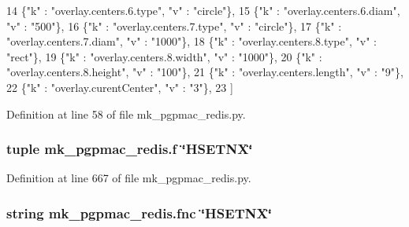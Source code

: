 \begin{DoxyCode}
14     \{\textcolor{stringliteral}{"k"} : \textcolor{stringliteral}{"overlay.centers.6.type"},   \textcolor{stringliteral}{"v"} : \textcolor{stringliteral}{"circle"}\},
15     \{\textcolor{stringliteral}{"k"} : \textcolor{stringliteral}{"overlay.centers.6.diam"},   \textcolor{stringliteral}{"v"} : \textcolor{stringliteral}{"500"}\},
16     \{\textcolor{stringliteral}{"k"} : \textcolor{stringliteral}{"overlay.centers.7.type"},   \textcolor{stringliteral}{"v"} : \textcolor{stringliteral}{"circle"}\},
17     \{\textcolor{stringliteral}{"k"} : \textcolor{stringliteral}{"overlay.centers.7.diam"},   \textcolor{stringliteral}{"v"} : \textcolor{stringliteral}{"1000"}\},
18     \{\textcolor{stringliteral}{"k"} : \textcolor{stringliteral}{"overlay.centers.8.type"},   \textcolor{stringliteral}{"v"} : \textcolor{stringliteral}{"rect"}\},
19     \{\textcolor{stringliteral}{"k"} : \textcolor{stringliteral}{"overlay.centers.8.width"},  \textcolor{stringliteral}{"v"} : \textcolor{stringliteral}{"1000"}\},
20     \{\textcolor{stringliteral}{"k"} : \textcolor{stringliteral}{"overlay.centers.8.height"}, \textcolor{stringliteral}{"v"} : \textcolor{stringliteral}{"100"}\},
21     \{\textcolor{stringliteral}{"k"} : \textcolor{stringliteral}{"overlay.centers.length"},   \textcolor{stringliteral}{"v"} : \textcolor{stringliteral}{"9"}\},
22     \{\textcolor{stringliteral}{"k"} : \textcolor{stringliteral}{"overlay.curentCenter"},     \textcolor{stringliteral}{"v"} : \textcolor{stringliteral}{"3"}\},
23     ]
\end{DoxyCode}


Definition at line 58 of file mk\-\_\-pgpmac\-\_\-redis.\-py.

\hypertarget{namespacemk__pgpmac__redis_a057fe7457503e0de97edcf855591ed58}{
\subsubsection[{f}]{\setlength{\rightskip}{0pt plus 5cm}tuple mk\-\_\-pgpmac\-\_\-redis.\-f \char`\"{}H\-S\-E\-T\-N\-X\char`\"{}}}\label{namespacemk__pgpmac__redis_a057fe7457503e0de97edcf855591ed58}


Definition at line 667 of file mk\-\_\-pgpmac\-\_\-redis.\-py.

\hypertarget{namespacemk__pgpmac__redis_a654b54ba0758b8b84516938260851129}{
\subsubsection[{fnc}]{\setlength{\rightskip}{0pt plus 5cm}string mk\-\_\-pgpmac\-\_\-redis.\-fnc \char`\"{}H\-S\-E\-T\-N\-X\char`\"{}}}\label{namespacemk__pgpmac__redis_a654b54ba0758b8b84516938260851129}


